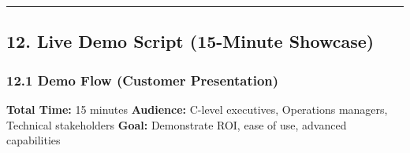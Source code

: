 \documentclass[
]{article}
\begin{document}
\begin{center}\rule{0.5\linewidth}{0.5pt}\end{center}

\hypertarget{live-demo-script-15-minute-showcase}{%
\subsection{12. Live Demo Script (15-Minute
Showcase)}\label{live-demo-script-15-minute-showcase}}

\hypertarget{demo-flow-customer-presentation}{%
\subsubsection{12.1 Demo Flow (Customer
Presentation)}\label{demo-flow-customer-presentation}}

\textbf{Total Time:} 15 minutes \textbf{Audience:} C-level executives,
Operations managers, Technical stakeholders \textbf{Goal:} Demonstrate
ROI, ease of use, advanced capabilities
\end{document}
